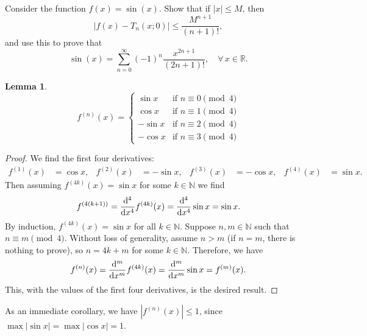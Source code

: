 \documentclass[12pt]{article}
\newenvironment{problem}
    {\begin{lrbox}{\mybox}\begin{minipage}{0.98\textwidth}}
    {\end{minipage}\end{lrbox}\begin{center}\framebox[\textwidth]{\usebox{\mybox}}\end{center}}
\theoremstyle{definition}
\newtheorem{lemma}{Lemma}
\newcommand{\N}{\mathbb{N}}
\newcommand{\R}{\mathbb{R}}
\begin{document}
\newpage
\section{}
\begin{problem}
    Consider the function $f(x) = \sin(x)$. Show that if $|x|\le M$, then 
    \begin{equation}
    \left | f(x) - T_n(x;0)\right | \le \frac{M^{n+1}}{(n+1)!},
    \end{equation}
    and use this to prove that 
    \begin{equation}
    \sin(x) = \sum_{n=0}^\infty (-1)^n \frac{x^{2n+1}}{(2n+1)!},\quad \forall\,x\in\R.
    \end{equation}
\end{problem}

\begin{lemma}
    \[
        f^{(n)}(x)
        = \begin{cases}
            \sin x &\text{if $n \equiv 0 \pmod{4}$} \\
            \cos x &\text{if $n \equiv 1 \pmod{4}$} \\
            -\sin x &\text{if $n \equiv 2 \pmod{4}$} \\
            -\cos x &\text{if $n \equiv 3 \pmod{4}$}
        \end{cases}
    \]
\end{lemma}

\begin{proof}
    We find the first four derivatives:
    \begin{align*}
        f^{(1)}(x) &= \cos x, & f^{(2)}(x) &= -\sin x, & f^{(3)}(x) &=  -\cos x, & f^{(4)}(x) &= \sin x.
    \end{align*}
    Then assuming $f^{(4k)}(x) = \sin x$ for some $k \in \N$ we find
    \[
        f^{(4(k+1))} = \dv[4]{x} f^{(4k)}(x) = \dv[4]{x} \sin x = \sin x.
    \]
    By induction, $f^{(4k)}(x) = \sin x$ for all $k \in \N$. Suppose $n, m \in \N$ such that $n \equiv m \pmod{4}$. Without loss of generality, assume $n > m$ (if $n = m$, there is nothing to prove), so $n = 4k + m$ for some $k \in \N$. Therefore, we have
    \[
        f^{(n)}(x) = \dv[m]{x} f^{(4k)}(x) = \dv[m]{x} \sin x = f^{(m)}(x).
    \]
    This, with the values of the first four derivatives, is the desired result.
    
\end{proof}

As an immediate corollary, we have $|f^{(n)}(x)| \leq 1$, since $\max|\sin x| = \max|\cos x| = 1$.
\end{document}
